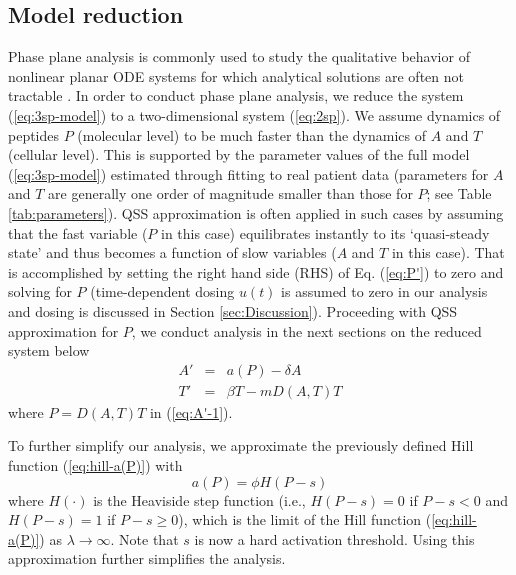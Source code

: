 \documentclass[review,authoryear]{elsarticle}
\begin{document}
\subsection{Model reduction}
Phase plane analysis is commonly used to study the qualitative behavior of nonlinear planar ODE systems for which analytical solutions are often not tractable \citep[see, e.g.,][Chapter 2]{jordan2007nonlinear}. In order to conduct phase plane analysis, we reduce the system (\ref{eq:3sp-model}) to a two-dimensional system (\ref{eq:2sp}). We assume dynamics of peptides $P$ (molecular level) to be much faster than the dynamics of $A$ and $T$ (cellular level).
This is supported by the parameter values of the full model (\ref{eq:3sp-model}) estimated through fitting to real
patient data (parameters for $A$ and $T$ are generally one order of magnitude smaller than those for $P$; see Table \ref{tab:parameters}). QSS approximation is often applied in such cases by assuming that the fast variable ($P$ in this case) equilibrates instantly to its `quasi-steady state' and thus becomes a function of slow variables ($A$ and $T$ in this case). That is accomplished by setting the right hand side (RHS) of Eq. (\ref{eq:P'}) to zero and solving for $P$ (time-dependent dosing $u(t)$ is assumed to zero in our analysis and dosing is discussed in Section \ref{sec:Discussion}). Proceeding with QSS
approximation for $P$, we conduct analysis in the next sections on
the reduced system below
\begin{subequations} \label{eq:2sp}
\begin{eqnarray}
A' & = & a(P)-\delta A \label{eq:A'-1}\\
T' & = & \beta T-mD(A,T)T \label{eq:T'-1}
\end{eqnarray}
\end{subequations}
where $P=D(A,T)T$ in (\ref{eq:A'-1}).

To further simplify our analysis, we approximate the previously defined Hill function (\ref{eq:hill-a(P)}) with 
\begin{equation} \label{eq:heaviside}
a(P)=\phi H(P-s)
\end{equation}
where $H(\cdot)$ is the Heaviside step function (i.e., $H(P-s)=0$ if $P-s<0$
and $H(P-s)=1$ if $P-s\ge0$), which is the limit of the Hill
function (\ref{eq:hill-a(P)}) as $\lambda\to\infty$. Note that $s$ is now a hard activation threshold. Using this approximation further simplifies the analysis. 
\end{document}

